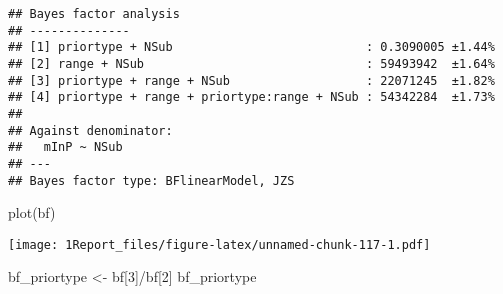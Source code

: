\documentclass[
]{article}
\newenvironment{Shaded}{\begin{snugshade}}{\end{snugshade}}
\newcommand{\AttributeTok}[1]{\textcolor[rgb]{0.77,0.63,0.00}{#1}}
\newcommand{\DecValTok}[1]{\textcolor[rgb]{0.00,0.00,0.81}{#1}}
\newcommand{\FunctionTok}[1]{\textcolor[rgb]{0.00,0.00,0.00}{#1}}
\newcommand{\NormalTok}[1]{#1}
\newcommand{\OtherTok}[1]{\textcolor[rgb]{0.56,0.35,0.01}{#1}}
\newcommand{\SpecialCharTok}[1]{\textcolor[rgb]{0.00,0.00,0.00}{#1}}
\newcommand{\StringTok}[1]{\textcolor[rgb]{0.31,0.60,0.02}{#1}}
\begin{document}
\begin{Shaded}
\end{Shaded}

\begin{verbatim}
## Bayes factor analysis
## --------------
## [1] priortype + NSub                           : 0.3090005 ±1.44%
## [2] range + NSub                               : 59493942  ±1.64%
## [3] priortype + range + NSub                   : 22071245  ±1.82%
## [4] priortype + range + priortype:range + NSub : 54342284  ±1.73%
## 
## Against denominator:
##   mInP ~ NSub 
## ---
## Bayes factor type: BFlinearModel, JZS
\end{verbatim}

\begin{Shaded}
\begin{Highlighting}[]
\FunctionTok{plot}\NormalTok{(bf)}
\end{Highlighting}
\end{Shaded}

\texttt{[image: 1Report\_files/figure-latex/unnamed-chunk-117-1.pdf]}

\begin{Shaded}
\begin{Highlighting}[]
\NormalTok{ bf\_priortype }\OtherTok{\textless{}{-}}\NormalTok{ bf[}\DecValTok{3}\NormalTok{]}\SpecialCharTok{/}\NormalTok{bf[}\DecValTok{2}\NormalTok{]}
\NormalTok{ bf\_priortype}
\end{Highlighting}
\end{Shaded}
\end{document}
